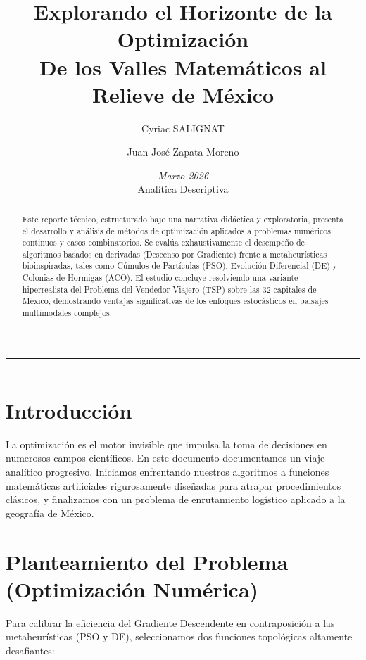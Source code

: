 \documentclass[11pt,a4paper]{article}
\title{\Huge\textbf{\textcolor{primary}{Explorando el Horizonte de la Optimización}} \\ \vspace{0.5em} \Large De los Valles Matemáticos al Relieve de México}
\author{Cyriac SALIGNAT \and Juan José Zapata Moreno}
\date{\textit{Marzo 2026} \\ Analítica Descriptiva}
\begin{document}
\maketitle

\vspace{-1em}
\hrule
\vspace{1em}
\begin{abstract}
\noindent Este reporte técnico, estructurado bajo una narrativa didáctica y exploratoria, presenta el desarrollo y análisis de métodos de optimización aplicados a problemas numéricos continuos y casos combinatorios. Se evalúa exhaustivamente el desempeño de algoritmos basados en derivadas (Descenso por Gradiente) frente a metaheurísticas bioinspiradas, tales como Cúmulos de Partículas (PSO), Evolución Diferencial (DE) y Colonias de Hormigas (ACO). El estudio concluye resolviendo una variante hiperrealista del Problema del Vendedor Viajero (TSP) sobre las 32 capitales de México, demostrando ventajas significativas de los enfoques estocásticos en paisajes multimodales complejos.
\end{abstract}
\vspace{1em}
\hrule

\section{Introducción}

La optimización es el motor invisible que impulsa la toma de decisiones en numerosos campos científicos. En este documento documentamos un viaje analítico progresivo. Iniciamos enfrentando nuestros algoritmos a funciones matemáticas artificiales rigurosamente diseñadas para atrapar procedimientos clásicos, y finalizamos con un problema de enrutamiento logístico aplicado a la geografía de México.

\section{Planteamiento del Problema (Optimización Numérica)}

Para calibrar la eficiencia del Gradiente Descendente en contraposición a las metaheurísticas (PSO y DE), seleccionamos dos funciones topológicas altamente desafiantes:
\end{document}
